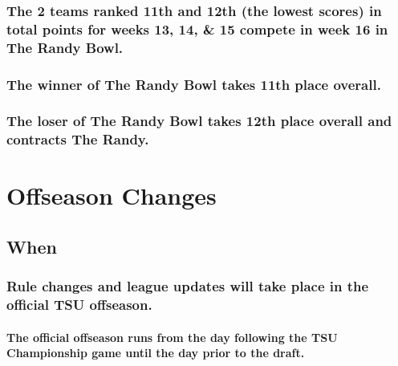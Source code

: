 \documentclass[
]{book}
\begin{document}
\hypertarget{the-2-teams-ranked-11th-and-12th-the-lowest-scores-in-total-points-for-weeks-13-14-15-compete-in-week-16-in-the-randy-bowl.}{%
\subsection{The 2 teams ranked 11th and 12th (the lowest scores) in total points for weeks 13, 14, \& 15 compete in week 16 in The Randy Bowl.}\label{the-2-teams-ranked-11th-and-12th-the-lowest-scores-in-total-points-for-weeks-13-14-15-compete-in-week-16-in-the-randy-bowl.}}

\hypertarget{the-winner-of-the-randy-bowl-takes-11th-place-overall.}{%
\subsection{The winner of The Randy Bowl takes 11th place overall.}\label{the-winner-of-the-randy-bowl-takes-11th-place-overall.}}

\hypertarget{the-loser-of-the-randy-bowl-takes-12th-place-overall-and-contracts-the-randy.}{%
\subsection{The loser of The Randy Bowl takes 12th place overall and contracts The Randy.}\label{the-loser-of-the-randy-bowl-takes-12th-place-overall-and-contracts-the-randy.}}

\hypertarget{offseason-changes}{%
\chapter{Offseason Changes}\label{offseason-changes}}

\hypertarget{when-1}{%
\section{When}\label{when-1}}

\hypertarget{rule-changes-and-league-updates-will-take-place-in-the-official-tsu-offseason.}{%
\subsection{Rule changes and league updates will take place in the official TSU offseason.}\label{rule-changes-and-league-updates-will-take-place-in-the-official-tsu-offseason.}}

\hypertarget{the-official-offseason-runs-from-the-day-following-the-tsu-championship-game-until-the-day-prior-to-the-draft.}{%
\subsubsection{The official offseason runs from the day following the TSU Championship game until the day prior to the draft.}\label{the-official-offseason-runs-from-the-day-following-the-tsu-championship-game-until-the-day-prior-to-the-draft.}}
\end{document}
